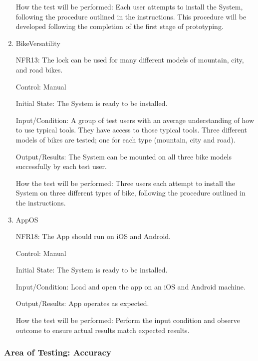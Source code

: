 \documentclass[12pt, titlepage]{article}
\begin{document}
\begin{enumerate}
How the test will be performed: Each user attempts to install the System, following the procedure outlined in the instructions. This procedure will be developed following the completion of the first stage of prototyping. 

\item{BikeVersatility

NFR13: The lock can be used for many different models of mountain, city, and road bikes.  }

Control: Manual 

Initial State: The System is ready to be installed. 

Input/Condition: A group of test users with an average understanding of how to use typical tools. They have access to those typical tools. Three different models of bikes are tested; one for each type (mountain, city and road). 

Output/Results: The System can be mounted on all three bike models successfully by each test user. 

How the test will be performed: Three users each attempt to install the System on three different types of bike, following the procedure outlined in the instructions.  

\item{AppOS

NFR18: The App should run on iOS and Android.  }

Control: Manual 

Initial State: The System is ready to be installed. 

Input/Condition: Load and open the app on an iOS and Android machine.

Output/Results: App operates as expected.

How the test will be performed: Perform the input condition and observe outcome to ensure actual results match expected results.  
\end{enumerate}

\subsubsection{Area of Testing: Accuracy}
\end{document}

